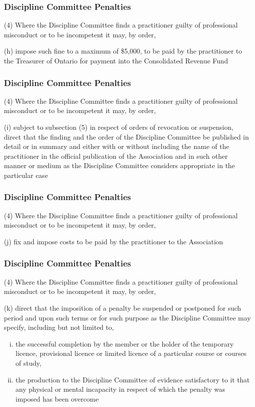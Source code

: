 \begin{frame}
\frametitle{Discipline Committee Penalties}

(4) Where the Discipline Committee finds a practitioner guilty of professional misconduct or to be incompetent it may, by order,


(h) impose such fine to a maximum of \$5,000, to be paid by
		the practitioner to the Treasurer of Ontario for payment into
		the Consolidated Revenue Fund


\end{frame}

\begin{frame}
\frametitle{Discipline Committee Penalties}

(4) Where the Discipline Committee finds a practitioner guilty of professional misconduct or to be incompetent it may, by order,

(i) subject to subsection (5) in respect of orders of revocation
		or suspension, direct that the finding and the order of the
		Discipline Committee be published in detail or in summary
		and either with or without including the name of the
		practitioner in the official publication of the Association and
		in such other manner or medium as the Discipline
		Committee considers appropriate in the particular case



\end{frame}

\begin{frame}
\frametitle{Discipline Committee Penalties}

(4) Where the Discipline Committee finds a practitioner guilty of professional misconduct or to be incompetent it may, by order,


(j) fix and impose costs to be paid by the practitioner to the
		Association


\end{frame}

\begin{frame}
\frametitle{Discipline Committee Penalties}

(4) Where the Discipline Committee finds a practitioner guilty of professional misconduct or to be incompetent it may, by order,

(k) direct that the imposition of a penalty be suspended or
		postponed for such period and upon such terms or for such
		purpose as the Discipline Committee may specify, including
		but not limited to,
\begin{enumerate}[i)]
\item the successful completion by the member or the holder of the temporary licence, provisional licence or limited licence of a particular course or courses of study,
\item the production to the Discipline Committee of evidence satisfactory to it that any physical or mental incapacity in respect of which the penalty was imposed has been overcome
\end{enumerate}



\end{frame}

